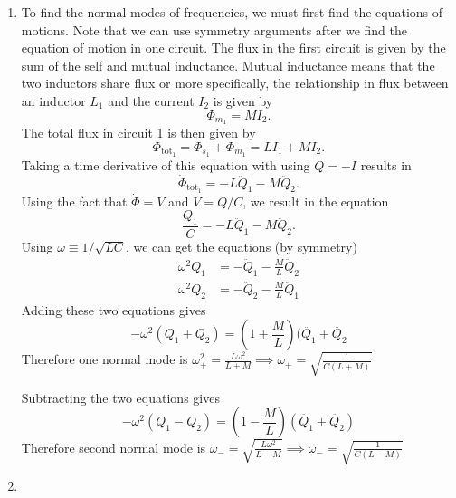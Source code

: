 \begin{sol}
\begin{enumerate}[label=\textbf{(\alph*)}] 
\item To find the normal modes of frequencies, we must first find the equations of motions. Note that we can use symmetry arguments after we find the equation of motion in one circuit. The flux in the first circuit is given by the sum of the self and mutual inductance. Mutual inductance means that the two inductors share flux or more specifically, the relationship in flux between an inductor $L_1$ and the current $I_2$ is given by 
\[\Phi_{m_{1}} = MI_2.\]
The total flux in circuit 1 is then given by 
\[\Phi_{\text{tot}_{1}} = \Phi_{s_{1}} + \Phi_{m_{1}} = L I_1 + M I_2.\]
Taking a time derivative of this equation with using $\dot{Q}= -I$ results in 
\[\dot{\Phi}_{\text{tot}_{1}} = -L \ddot{Q}_1 - M\ddot{Q}_2.\]
Using the fact that $\dot\Phi = V$ and $V = Q/C$, we result in the equation 
\[\frac{Q_1}{C} = -L\ddot{Q}_1 - M\ddot{Q}_2.\]
Using $\omega \equiv 1/\sqrt{LC}$, we can get the equations (by symmetry)
\begin{align*}
    \omega^2 Q_1 &= -\ddot{Q}_1 - \frac{M}{L}\ddot{Q}_2 \\
    \omega^2 Q_2 &= -\ddot{Q}_2 - \frac{M}{L}\ddot{Q}_1
\end{align*}
Adding these two equations gives $$-\omega^2 (Q_1 + Q_2) = \left(1 + \frac{M}{L}\right)(\ddot {Q_1} + \ddot {Q_2}$$
Therefore one normal mode is $\omega_+^2 = \frac{L \omega^2}{L+M} \implies \omega_+ = \sqrt{\frac{1}{C(L+M)}}$

Subtracting the two equations gives 
$$-\omega^2 (Q_1-Q_2) = \left(1 - \frac{M}{L}\right) (\ddot {Q_1} + \ddot {Q_2})$$
Therefore second normal mode is $\omega_- = \sqrt{\frac{L \omega^2}{L-M}} \implies \omega_- = \sqrt{\frac{1}{C(L-M)}}$
\item 
\end{enumerate}
\end{sol}